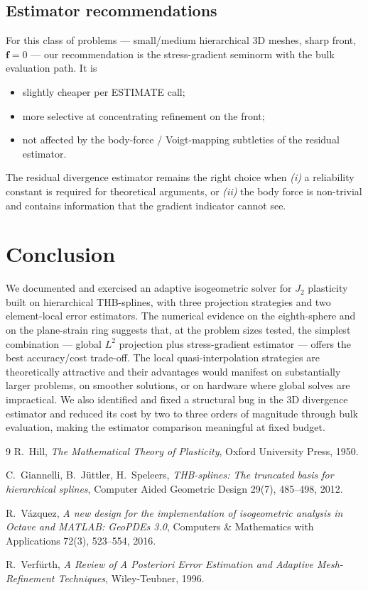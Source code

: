 \documentclass[11pt,a4paper]{article}
\newcommand{\bff}{\mathbf{f}}
\begin{document}
\subsection{Estimator recommendations}

For this class of problems --- small/medium hierarchical 3D meshes,
sharp front, $\bff = 0$ --- our recommendation is the
stress-gradient seminorm with the bulk evaluation path.  It is
\begin{itemize}[leftmargin=2em]
    \item slightly cheaper per ESTIMATE call;
    \item more selective at concentrating refinement on the front;
    \item not affected by the body-force / Voigt-mapping subtleties
    of the residual estimator.
\end{itemize}
The residual divergence estimator remains the right choice when
\emph{(i)} a reliability constant is required for theoretical
arguments, or \emph{(ii)} the body force is non-trivial and contains
information that the gradient indicator cannot see.

\section{Conclusion}

We documented and exercised an adaptive isogeometric solver for $J_2$
plasticity built on hierarchical THB-splines, with three projection
strategies and two element-local error estimators.  The numerical
evidence on the eighth-sphere and on the plane-strain ring suggests
that, at the problem sizes tested, the simplest combination ---
global $L^2$ projection plus stress-gradient estimator --- offers
the best accuracy/cost trade-off.  The local quasi-interpolation
strategies are theoretically attractive and their advantages would
manifest on substantially larger problems, on smoother solutions, or
on hardware where global solves are impractical.  We also identified
and fixed a structural bug in the 3D divergence estimator and reduced
its cost by two to three orders of magnitude through bulk evaluation,
making the estimator comparison meaningful at fixed budget.

\begin{thebibliography}{9}
R.~Hill, \emph{The Mathematical Theory of Plasticity}, Oxford
University Press, 1950.

C.~Giannelli, B.~J\"uttler, H.~Speleers, \emph{THB-splines: The
truncated basis for hierarchical splines}, Computer Aided Geometric
Design 29(7), 485--498, 2012.

R.~V\'azquez, \emph{A new design for the implementation of isogeometric
analysis in Octave and MATLAB: GeoPDEs 3.0}, Computers \& Mathematics
with Applications 72(3), 523--554, 2016.

R.~Verf\"urth, \emph{A Review of A Posteriori Error Estimation and
Adaptive Mesh-Refinement Techniques}, Wiley-Teubner, 1996.

\end{thebibliography}
\end{document}

